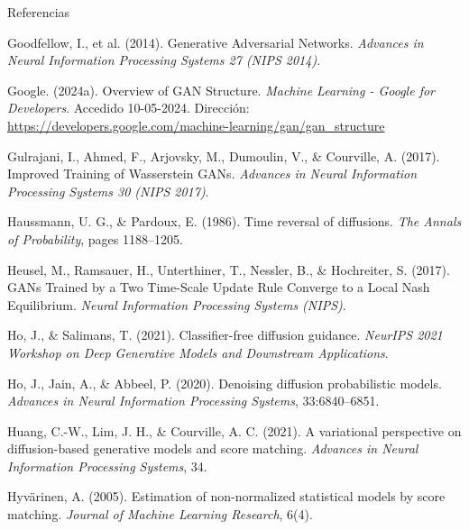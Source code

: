 \documentclass[aspectratio=169,xcolor=dvipsnames, t, spanish]{beamer}
\begin{document}
\begin{frame}{Referencias}
{\begin{thebibliography}{99}
             Goodfellow, I., et al. (2014).
            \newblock Generative Adversarial Networks.
            \newblock \emph{Advances in Neural Information Processing Systems 27 (NIPS 2014)}.

             Google. (2024a).
            \newblock Overview of GAN Structure.
            \newblock \emph{Machine Learning - Google for Developers}. Accedido 10-05-2024. Dirección: \url{https://developers.google.com/machine-learning/gan/gan_structure}

             Gulrajani, I., Ahmed, F., Arjovsky, M., Dumoulin, V., \& Courville, A. (2017).
            \newblock Improved Training of Wasserstein GANs.
            \newblock \emph{Advances in Neural Information Processing Systems 30 (NIPS 2017)}.

             Haussmann, U. G., \& Pardoux, E. (1986).
            \newblock Time reversal of diffusions.
            \newblock \emph{The Annals of Probability}, pages 1188–1205.
            
             Heusel, M., Ramsauer, H., Unterthiner, T., Nessler, B., \& Hochreiter, S. (2017).
            \newblock GANs Trained by a Two Time-Scale Update Rule Converge to a Local Nash Equilibrium.
            \newblock \emph{Neural Information Processing Systems (NIPS)}.

             Ho, J., \& Salimans, T. (2021).
            \newblock Classifier-free diffusion guidance.
            \newblock \emph{NeurIPS 2021 Workshop on Deep Generative Models and Downstream Applications}.

             Ho, J., Jain, A., \& Abbeel, P. (2020).
            \newblock Denoising diffusion probabilistic models.
            \newblock \emph{Advances in Neural Information Processing Systems}, 33:6840–6851.

             Huang, C.-W., Lim, J. H., \& Courville, A. C. (2021).
            \newblock A variational perspective on diffusion-based generative models and score matching.
            \newblock \emph{Advances in Neural Information Processing Systems}, 34.

             Hyvärinen, A. (2005).
            \newblock Estimation of non-normalized statistical models by score matching.
            \newblock \emph{Journal of Machine Learning Research}, 6(4).


\end{thebibliography}}
\end{frame}
\end{document}
